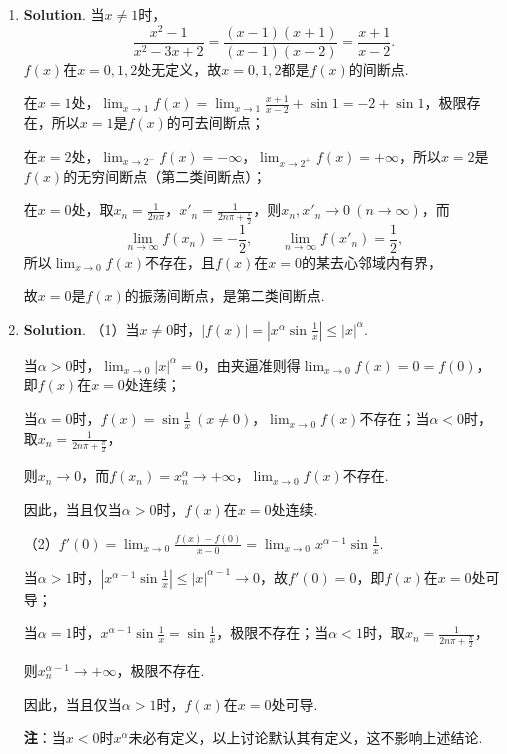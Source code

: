 \documentclass[../main.tex]{subfiles}
\begin{document}
\begin{enumerate}
    \item \textbf{Solution}. 当$x\neq1$时，
          \[
              \frac{x^{2}-1}{x^{2}-3x+2}=\frac{(x-1)(x+1)}{(x-1)(x-2)}=\frac{x+1}{x-2}.
          \]
          $f(x)$在$x=0,1,2$处无定义，故$x=0,1,2$都是$f(x)$的间断点.

          在$x=1$处，$\lim_{x\to1}f(x)=\lim_{x\to1}\frac{x+1}{x-2}+\sin1=-2+\sin1$，极限存在，所以$x=1$是$f(x)$的可去间断点；

          在$x=2$处，$\lim_{x\to2^{-}}f(x)=-\infty$，$\lim_{x\to2^{+}}f(x)=+\infty$，所以$x=2$是$f(x)$的无穷间断点（第二类间断点）；

          在$x=0$处，取$x_{n}=\frac{1}{2n\pi}$，$x'_{n}=\frac{1}{2n\pi+\frac{\pi}{2}}$，则$x_{n},x'_{n}\to0\ (n\to\infty)$，而
          \[
              \lim_{n\to\infty}f(x_{n})=-\frac{1}{2},\qquad\lim_{n\to\infty}f(x'_{n})=\frac{1}{2},
          \]
          所以$\lim_{x\to0}f(x)$不存在，且$f(x)$在$x=0$的某去心邻域内有界，

          故$x=0$是$f(x)$的振荡间断点，是第二类间断点.

    \item \textbf{Solution}. （1）当$x\neq0$时，$\left|f(x)\right|=\left|x^{\alpha}\sin\frac{1}{x}\right|\leq|x|^{\alpha}$.

          当$\alpha>0$时，$\lim_{x\to0}|x|^{\alpha}=0$，由夹逼准则得$\lim_{x\to0}f(x)=0=f(0)$，即$f(x)$在$x=0$处连续；

          当$\alpha=0$时，$f(x)=\sin\frac{1}{x}\ (x\neq0)$，$\lim_{x\to0}f(x)$不存在；当$\alpha<0$时，取$x_{n}=\frac{1}{2n\pi+\frac{\pi}{2}}$，

          则$x_{n}\to0$，而$f(x_{n})=x_{n}^{\alpha}\to+\infty$，$\lim_{x\to0}f(x)$不存在.

          因此，当且仅当$\alpha>0$时，$f(x)$在$x=0$处连续.

          （2）$f'(0)=\lim_{x\to0}\frac{f(x)-f(0)}{x-0}=\lim_{x\to0}x^{\alpha-1}\sin\frac{1}{x}$.

          当$\alpha>1$时，$\left|x^{\alpha-1}\sin\frac{1}{x}\right|\leq|x|^{\alpha-1}\to0$，故$f'(0)=0$，即$f(x)$在$x=0$处可导；

          当$\alpha=1$时，$x^{\alpha-1}\sin\frac{1}{x}=\sin\frac{1}{x}$，极限不存在；当$\alpha<1$时，取$x_{n}=\frac{1}{2n\pi+\frac{\pi}{2}}$，

          则$x_{n}^{\alpha-1}\to+\infty$，极限不存在.

          因此，当且仅当$\alpha>1$时，$f(x)$在$x=0$处可导.

          \textbf{注}：当$x<0$时$x^{\alpha}$未必有定义，以上讨论默认其有定义，这不影响上述结论.


\end{enumerate}
\end{document}
